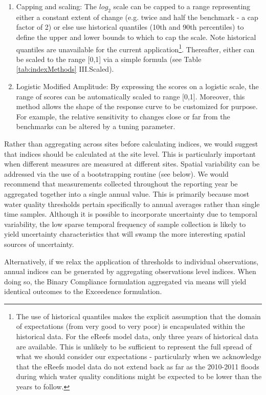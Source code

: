 \begin{enumerate}
\item Capping and scaling: The $log_2$ scale can be capped to a range representing either a constant
extent of change (e.g. twice and half the benchmark - a cap factor of 2) or else use historical
quantiles (10th and 90th percentiles) to define the upper and lower bounds to which to cap the
scale.  Note historical quantiles are unavailable for the current application\footnote{The use of
  historical quantiles makes the explicit assumption that the domain of expectations (from very good
  to very poor) is encapsulated within the historical data.  For the eReefs model data, only three
  years of historical data are available.  This is unlikely to be sufficient to represent the full
  spread of what we should consider our expectations - particularly when we acknowledge that the eReefs
  model data do not extend back as far as the 2010-2011 floods during which water quality conditions
might be expected to be lower than the years to follow.}. Thereafter, either
can be scaled to the range [0,1] via a simple formula (see Table \ref{tab:indexMethods} III.Scaled).
  
\item Logistic Modified Amplitude: By expressing the scores on a logistic scale, the range of scores
can be automatically scaled to range [0,1].  Moreover, this method allows the shape of the response
curve to be customized for purpose.  For example, the relative sensitivity to changes close or far
from the benchmarks can be altered by a tuning parameter.
\end{enumerate}

Rather than aggregating across sites before calculating indices, we would suggest that indices
should be calculated at the site level.  This is particularly important when different measures are
measured at different sites.  Spatial variability can be addressed via the use of a bootstrapping
routine (see below).  We would recommend that measurements collected throughout the reporting year
be aggregated together into a single annual value.  This is primarily because most water quality
thresholds pertain specifically to annual averages rather than single time samples. Although it is
possible to incorporate uncertainty due to temporal variability, the low sparse temporal frequency
of sample collection is likely to yield uncertainty characteristics that will swamp the more
interesting spatial sources of uncertainty.

Alternatively, if we relax the application of thresholds to individual observations, annual indices
can be generated by aggregating observations level indices.  When doing so, the Binary Compliance
formulation aggregated via means will yield identical outcomes to the Exceedence formulation.

